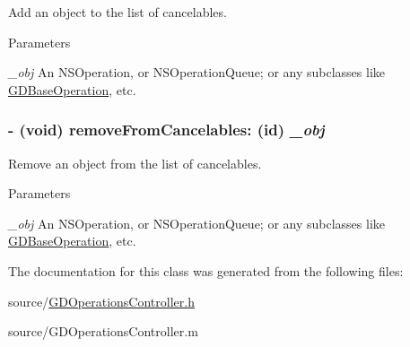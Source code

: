 Add an object to the list of cancelables. 
\begin{DoxyParams}{Parameters}
\item[{\em \_\-obj}]An NSOperation, or NSOperationQueue; or any subclasses like \hyperlink{interface_g_d_base_operation}{GDBaseOperation}, etc. \end{DoxyParams}
\hypertarget{interface_g_d_operations_controller_aa4811a04380d3870e3827ae33db9ac35}{
\subsubsection[{removeFromCancelables:}]{\setlength{\rightskip}{0pt plus 5cm}-\/ (void) removeFromCancelables: (id) {\em \_\-obj}}}
\label{interface_g_d_operations_controller_aa4811a04380d3870e3827ae33db9ac35}


Remove an object from the list of cancelables. 
\begin{DoxyParams}{Parameters}
\item[{\em \_\-obj}]An NSOperation, or NSOperationQueue; or any subclasses like \hyperlink{interface_g_d_base_operation}{GDBaseOperation}, etc. \end{DoxyParams}


The documentation for this class was generated from the following files:\begin{DoxyCompactItemize}
\item 
source/\hyperlink{_g_d_operations_controller_8h}{GDOperationsController.h}\item 
source/GDOperationsController.m\end{DoxyCompactItemize}
